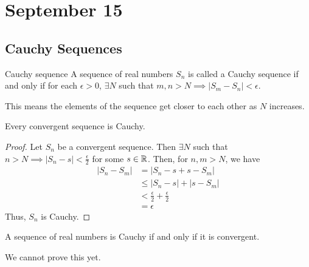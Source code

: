 \chapter{September 15}

\section{Cauchy Sequences}
\begin{definition}{Cauchy sequence}{}
    A sequence of real numbers $S_n$ is called a Cauchy sequence if and only if for each $\epsilon > 0$, $\exists N$ such that $m, n > N \implies |S_m - S_n| < \epsilon$.
\end{definition}
\begin{note}
    This means the elements of the sequence get closer to each other as $N$ increases.
\end{note}

\begin{theorem}{}{}
    Every convergent sequence is Cauchy.
\end{theorem}
\begin{proof}
    Let $S_n$ be a convergent sequence. Then $\exists N$ such that $n > N \implies |S_n - s| < \frac{\epsilon}{2}$ for some $s \in \mathbb{R}$. Then, for $n, m > N$, we have
    \begin{align*}
        |S_n - S_m| &= |S_n - s + s - S_m| \\
        &\leq |S_n - s| + |s - S_m| \\
        &< \frac{\epsilon}{2} + \frac{\epsilon}{2} \\
        &= \epsilon
    \end{align*}
    Thus, $S_n$ is Cauchy.
\end{proof}

\begin{theorem}{}{}
    A sequence of real numbers is Cauchy if and only if it is convergent.
\end{theorem}
\begin{note}
    We cannot prove this yet.
\end{note}